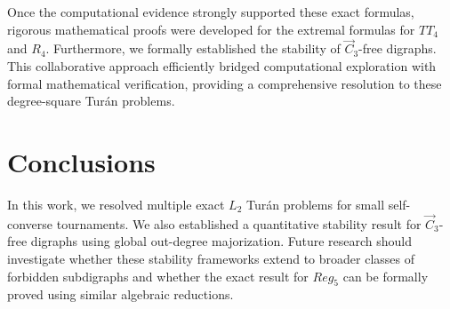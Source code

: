 \documentclass[a4paper]{amsart}
\begin{document}
Once the computational evidence strongly supported these exact formulas, rigorous mathematical proofs were developed for the extremal formulas for $TT_4$ and $R_4$. Furthermore, we formally established the stability of $\vec{C}_3$-free digraphs. This collaborative approach efficiently bridged computational exploration with formal mathematical verification, providing a comprehensive resolution to these degree-square Tur\'an problems.

\section{Conclusions}

In this work, we resolved multiple exact $L_2$ Tur\'an problems for small self-converse tournaments.
We also established a quantitative stability result for $\vec{C}_3$-free digraphs using global out-degree majorization.
Future research should investigate whether these stability frameworks extend to broader classes of forbidden subdigraphs and whether the exact result for $Reg_5$ can be formally proved using similar algebraic reductions.
\end{document}
